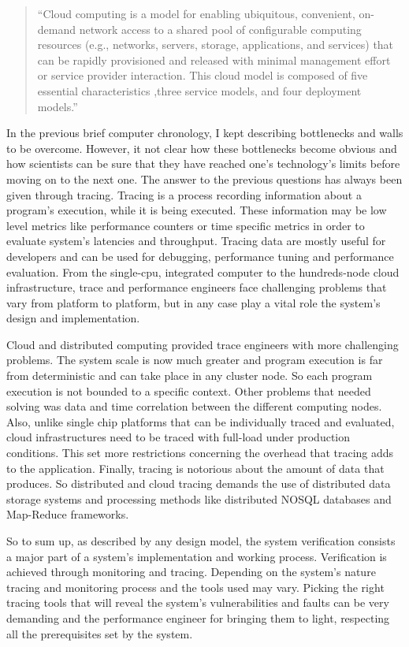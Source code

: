 \begin{quotation}
    ``Cloud computing is a model for enabling ubiquitous, convenient, on-demand
    network access to a shared pool of configurable computing resources (e.g.,
    networks, servers, storage, applications, and services) that can be rapidly
    provisioned and released with minimal management effort or service provider
    interaction.  This cloud model is composed of five essential characteristics
    ,three service models, and four deployment models.''\cite{clouddef}
\end{quotation}

In the previous brief computer chronology, I kept describing bottlenecks and
walls to be overcome. However, it not clear how these bottlenecks become obvious
and how scientists can be sure that they have reached one's technology's limits
before moving on to the next one. The answer to the previous questions has
always been given through tracing. Tracing is a process recording information
about a program's execution, while it is being executed. These information may
be low level metrics like performance counters or time specific metrics in order
to evaluate system's latencies and throughput. Tracing data are mostly useful
for developers and can be used for debugging, performance tuning and performance
evaluation. From the single-cpu, integrated computer to the hundreds-node cloud
infrastructure, trace and performance engineers face challenging problems that
vary from platform to platform, but in any case play a vital role the system's
design and implementation.

Cloud and distributed computing provided trace engineers with more challenging
problems. The system scale is now much greater and program execution is far from
deterministic and can take place in any cluster node. So each program execution
is not bounded to a specific context. Other problems that needed solving
was data and time correlation between the different computing nodes. Also,
unlike single chip platforms that can be individually traced and evaluated,
cloud infrastructures need to be traced with full-load under production
conditions. This set more restrictions concerning the overhead that tracing adds
to the application. Finally, tracing is notorious about the amount of data that
produces. So distributed and cloud tracing demands the use of distributed data
storage systems and processing methods like distributed NOSQL databases and
Map-Reduce frameworks.

So to sum up, as described by any design model, the system verification consists
a major part of a system's implementation and working  process. Verification is
achieved through monitoring and tracing. Depending on the system's nature
tracing and monitoring process and the tools used may vary. Picking the right
tracing tools that will reveal the system's vulnerabilities and faults can be
very demanding and the performance engineer for bringing them to light,
respecting all the prerequisites set by the system.

